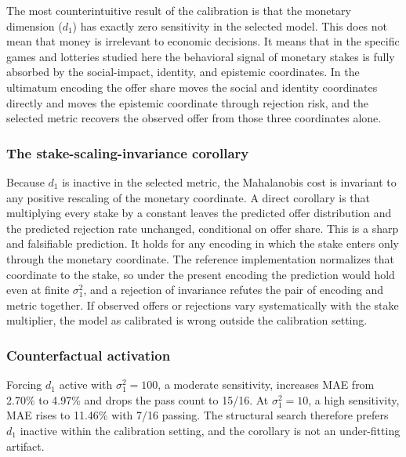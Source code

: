 \documentclass[journal]{IEEEtran}
\begin{document}
The most counterintuitive result of the calibration is that the monetary dimension ($d_1$) has exactly zero sensitivity in the selected model.
This does not mean that money is irrelevant to economic decisions.
It means that in the specific games and lotteries studied here the behavioral signal of monetary stakes is fully absorbed by the social-impact, identity, and epistemic coordinates.
In the ultimatum encoding the offer share moves the social and identity coordinates directly and moves the epistemic coordinate through rejection risk, and the selected metric recovers the observed offer from those three coordinates alone.

\subsubsection{The stake-scaling-invariance corollary}
Because $d_1$ is inactive in the selected metric, the Mahalanobis cost is invariant to any positive rescaling of the monetary coordinate.
A direct corollary is that multiplying every stake by a constant leaves the predicted offer distribution and the predicted rejection rate unchanged, conditional on offer share.
This is a sharp and falsifiable prediction.
It holds for any encoding in which the stake enters only through the monetary coordinate.
The reference implementation normalizes that coordinate to the stake, so under the present encoding the prediction would hold even at finite $\sigma_1^2$, and a rejection of invariance refutes the pair of encoding and metric together.
If observed offers or rejections vary systematically with the stake multiplier, the model as calibrated is wrong outside the calibration setting.

\subsubsection{Counterfactual activation}
Forcing $d_1$ active with $\sigma_1^2=100$, a moderate sensitivity, increases MAE from 2.70\% to 4.97\% and drops the pass count to 15/16.
At $\sigma_1^2=10$, a high sensitivity, MAE rises to 11.46\% with 7/16 passing.
The structural search therefore prefers $d_1$ inactive within the calibration setting, and the corollary is not an under-fitting artifact.
\end{document}
